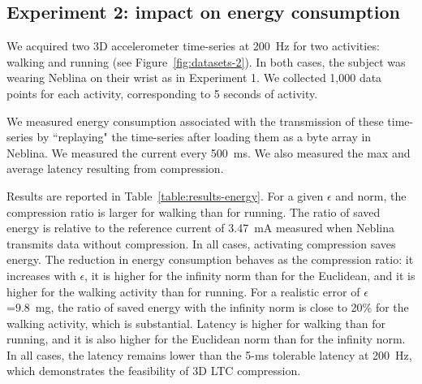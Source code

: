 \documentclass[10pt, conference, compsocconf]{IEEEtran}
\begin{document}

\subsection{Experiment 2: impact on energy consumption}

We acquired two 3D accelerometer time-series at 200~Hz for two 
activities: walking and running (see Figure~\ref{fig:datasets-2}). In 
both cases, the subject was wearing Neblina on their wrist as in 
Experiment 1. We collected 1,000 data points for each activity, 
corresponding to 5 seconds of activity.

We measured energy consumption associated with the transmission of 
these time-series by ``replaying" the time-series after loading them as 
a byte array in Neblina. We measured the current every 500~ms. We also 
measured the max and average latency resulting from compression.

 Results are reported in Table~\ref{table:results-energy}. For a given
 $\epsilon$ and norm, the compression ratio is larger for walking than
 for running. The ratio of saved energy is relative to the reference
 current of 3.47~mA measured when Neblina transmits data without
 compression. In all cases, activating compression saves energy. The 
 reduction in energy consumption behaves as the compression ratio: it 
 increases with $\epsilon$, it is higher for the infinity norm than for 
 the Euclidean, and it is higher for the walking activity than for 
 running. For a realistic error of $\epsilon$=9.8~mg, the ratio of 
 saved energy with the infinity norm is close to 20\% for the walking 
 activity, which is substantial. Latency is higher for walking 
 than for running, and it is also higher for the Euclidean norm than 
 for the infinity norm. In all cases, the latency remains lower 
 than the 5-ms tolerable latency at 200~Hz, which demonstrates the 
 feasibility of 3D LTC compression.
\end{document}
